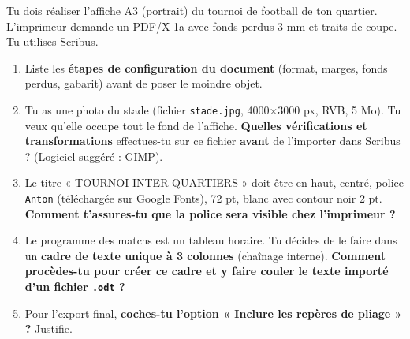 \documentclass[11pt]{article}
\begin{document}
\begin{exercice}
Tu dois réaliser l'affiche A3 (portrait) du tournoi de football de ton quartier. L'imprimeur demande un PDF/X-1a avec fonds perdus 3 mm et traits de coupe. Tu utilises Scribus.
\begin{enumerate}
    \item Liste les \textbf{étapes de configuration du document} (format, marges, fonds perdus, gabarit) avant de poser le moindre objet.
    \item Tu as une photo du stade (fichier \texttt{stade.jpg}, 4000×3000 px, RVB, 5 Mo). Tu veux qu'elle occupe tout le fond de l'affiche. \textbf{Quelles vérifications et transformations} effectues-tu sur ce fichier \textbf{avant} de l'importer dans Scribus ? (Logiciel suggéré : GIMP).
    \item Le titre « TOURNOI INTER-QUARTIERS » doit être en haut, centré, police \texttt{Anton} (téléchargée sur Google Fonts), 72 pt, blanc avec contour noir 2 pt. \textbf{Comment t'assures-tu que la police sera visible chez l'imprimeur ?}
    \item Le programme des matchs est un tableau horaire. Tu décides de le faire dans un \textbf{cadre de texte unique à 3 colonnes} (chaînage interne). \textbf{Comment procèdes-tu pour créer ce cadre et y faire couler le texte importé d'un fichier \texttt{.odt} ?}
    \item Pour l'export final, \textbf{coches-tu l'option « Inclure les repères de pliage » ?} Justifie.
\end{enumerate}
\end{exercice}
\end{document}
